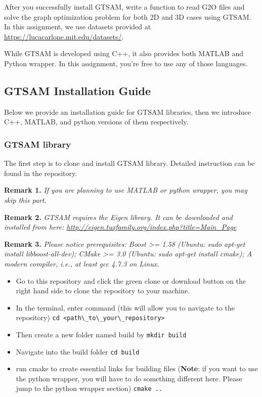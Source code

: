 \documentclass[tp]{lcc}
\begin{document}
After you successfully install GTSAM, write a function to read G2O files and solve the graph optimization problem for both 2D and 3D cases using GTSAM. In this assignment, we use datasets provided at \url{https://lucacarlone.mit.edu/datasets/}.

While GTSAM is developed using C++, it also provides both MATLAB and Python wrapper. In this assignment, you’re free to use any of those languages.

\subsection{GTSAM Installation Guide}
Below we provide an installation guide for GTSAM libraries, then we introduce C++, MATLAB, and python versions of them respectively.

\subsubsection{GTSAM library}
The first step is to clone and install GTSAM library. Detailed instruction can be found in the repository.

\textbf{Remark 1.} \textit{If you are planning to use MATLAB or python wrapper, you may skip this part.}

\textbf{Remark 2.} \textit{GTSAM requires the Eigen library. It can be downloaded and installed from here: \url{http://eigen.tuxfamily.org/index.php?title=Main_Page}}

\textbf{Remark 3.} \textit{Please notice prerequisites: Boost >= 1.58 (Ubuntu: sudo apt-get install libboost-all-dev); CMake >= 3.0 (Ubuntu: sudo apt-get install cmake); A modern compiler, i.e., at least gcc 4.7.3 on Linux.}

\begin{itemize}
    \item Go to this repository and click the green clone or download button on the right hand side to clone the repository to your machine.
    \item In the terminal, enter command (this will allow you to navigate to the repository) \lstinline[style=bash]{cd <path\_to\_your\_repository>}
    \item Then create a new folder named build by \lstinline[style=bash]{mkdir build}
    \item Navigate into the build folder \lstinline[style=bash]{cd build}
    \item run cmake to create essential links for building files (\textbf{Note}: if you want to use the python wrapper, you will have to do something different here. Please jump to the python wrapper section) \lstinline[style=bash]{cmake ..}
\end{itemize}
\end{document}
